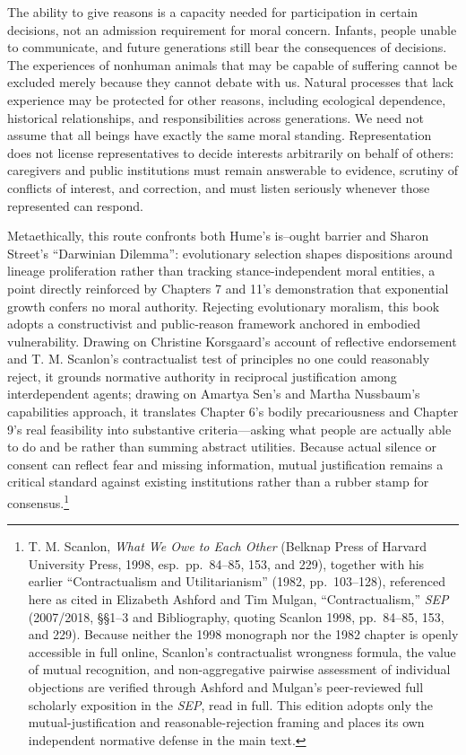 \documentclass[
  english,
  11pt,
  oneside]{book}
\begin{document}
The ability to give reasons is a capacity needed for participation in certain decisions, not an admission requirement for moral concern. Infants, people unable to communicate, and future generations still bear the consequences of decisions. The experiences of nonhuman animals that may be capable of suffering cannot be excluded merely because they cannot debate with us. Natural processes that lack experience may be protected for other reasons, including ecological dependence, historical relationships, and responsibilities across generations. We need not assume that all beings have exactly the same moral standing. Representation does not license representatives to decide interests arbitrarily on behalf of others: caregivers and public institutions must remain answerable to evidence, scrutiny of conflicts of interest, and correction, and must listen seriously whenever those represented can respond.

Metaethically, this route confronts both Hume's is--ought barrier and Sharon Street's ``Darwinian Dilemma'': evolutionary selection shapes dispositions around lineage proliferation rather than tracking stance-independent moral entities, a point directly reinforced by Chapters 7 and 11's demonstration that exponential growth confers no moral authority. Rejecting evolutionary moralism, this book adopts a constructivist and public-reason framework anchored in embodied vulnerability. Drawing on Christine Korsgaard's account of reflective endorsement and T. M. Scanlon's contractualist test of principles no one could reasonably reject, it grounds normative authority in reciprocal justification among interdependent agents; drawing on Amartya Sen's and Martha Nussbaum's capabilities approach, it translates Chapter 6's bodily precariousness and Chapter 9's real feasibility into substantive criteria---asking what people are actually able to do and be rather than summing abstract utilities. Because actual silence or consent can reflect fear and missing information, mutual justification remains a critical standard against existing institutions rather than a rubber stamp for consensus.\footnote{\hypertarget{ph-note-58}{}T. M. Scanlon, \emph{What We Owe to Each Other} (Belknap Press of Harvard University Press, 1998, esp.~pp.~84--85, 153, and 229), together with his earlier ``Contractualism and Utilitarianism'' (1982, pp.~103--128), referenced here as cited in Elizabeth Ashford and Tim Mulgan, ``Contractualism,'' \emph{SEP} (2007/2018, §§1--3 and Bibliography, quoting Scanlon 1998, pp.~84--85, 153, and 229). Because neither the 1998 monograph nor the 1982 chapter is openly accessible in full online, Scanlon's contractualist wrongness formula, the value of mutual recognition, and non-aggregative pairwise assessment of individual objections are verified through Ashford and Mulgan's peer-reviewed full scholarly exposition in the \emph{SEP}, read in full. This edition adopts only the mutual-justification and reasonable-rejection framing and places its own independent normative defense in the main text.}
\end{document}
